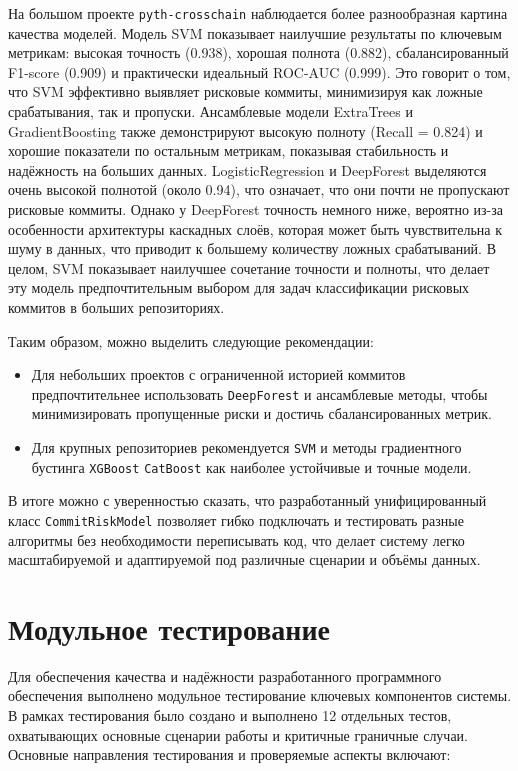 На большом проекте \texttt{pyth-crosschain} наблюдается более разнообразная картина качества моделей. Модель SVM показывает наилучшие результаты по ключевым метрикам: высокая точность (0.938), хорошая полнота (0.882), сбалансированный F1-score (0.909) и практически идеальный ROC-AUC (0.999). Это говорит о том, что SVM эффективно выявляет рисковые коммиты, минимизируя как ложные срабатывания, так и пропуски.
Ансамблевые модели ExtraTrees и GradientBoosting также демонстрируют высокую полноту (Recall = 0.824) и хорошие показатели по остальным метрикам, показывая стабильность и надёжность на больших данных.
LogisticRegression и DeepForest выделяются очень высокой полнотой (около 0.94), что означает, что они почти не пропускают рисковые коммиты. Однако у DeepForest точность немного ниже, вероятно из-за особенности архитектуры каскадных слоёв, которая может быть чувствительна к шуму в данных, что приводит к большему количеству ложных срабатываний.
В целом, SVM показывает наилучшее сочетание точности и полноты, что делает эту модель предпочтительным выбором для задач классификации рисковых коммитов в больших репозиториях.

Таким образом, можно выделить следующие рекомендации:
\begin{itemize}
	\item Для небольших проектов с ограниченной историей коммитов предпочтительнее использовать \texttt{DeepForest} и ансамблевые методы, чтобы минимизировать пропущенные риски и достичь сбалансированных метрик.
	\item Для крупных репозиториев рекомендуется \texttt{SVM} и методы градиентного бустинга \texttt{XGBoost} \texttt{CatBoost} как наиболее устойчивые и точные модели.
\end{itemize}

В итоге можно с уверенностью сказать, что разработанный унифицированный класс \texttt{CommitRiskModel} позволяет гибко подключать и тестировать разные алгоритмы без необходимости переписывать код, что делает систему легко масштабируемой и адаптируемой под различные сценарии и объёмы данных.

\section{Модульное тестирование}

Для обеспечения качества и надёжности разработанного программного обеспечения выполнено модульное тестирование ключевых компонентов системы. В рамках тестирования было создано и выполнено 12 отдельных тестов, охватывающих основные сценарии работы и критичные граничные случаи. Основные направления тестирования и проверяемые аспекты включают:

